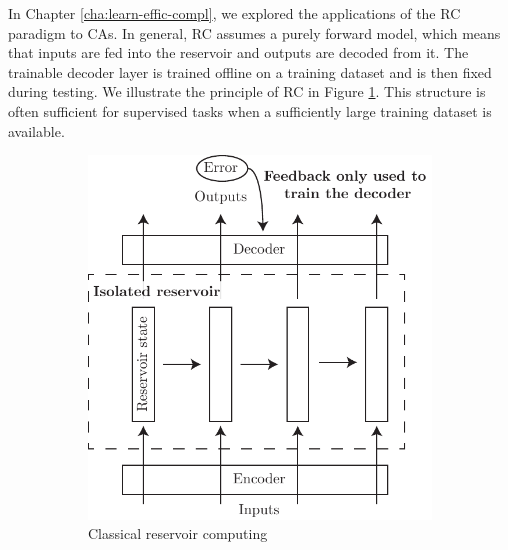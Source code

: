 In Chapter \ref{cha:learn-effic-compl}, we explored the applications of the
\acl{RC} paradigm to \acfp{CA}. In general, \ac{RC} assumes a purely forward
model, which means that inputs are fed into the reservoir and outputs are decoded from
it. The trainable decoder layer is trained offline on a training dataset and
is then fixed during testing. We illustrate the principle of \ac{RC} in Figure
\ref{fig:classical_reservoir}. This structure is often sufficient for supervised
tasks when a sufficiently large training dataset is available.

\begin{figure}[htbp]
  \centering
  \begin{subfigure}[t]{.5\linewidth}
    \centering
    \includegraphics[width=\linewidth]{figures/classical_reservoir.pdf}
    \caption{Classical reservoir computing}
    \label{fig:classical_reservoir}
  \end{subfigure}
  \begin{subfigure}[t]{.45\linewidth}
    \centering

\end{subfigure}
\end{figure}
